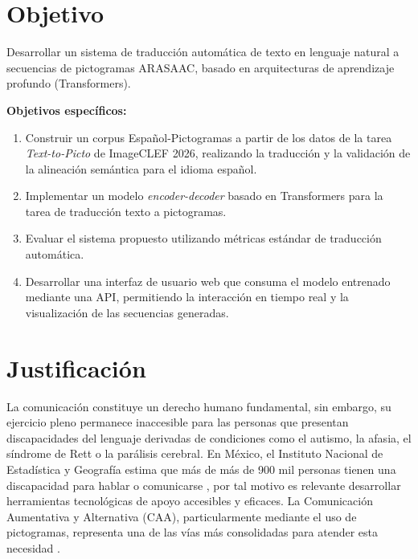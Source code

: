 \documentclass[10pt,letterpaper]{article}
\begin{document}







\section{Objetivo}
Desarrollar un sistema de traducción automática de texto en lenguaje natural a secuencias de pictogramas ARASAAC, basado en arquitecturas de aprendizaje profundo (Transformers).

\textbf{Objetivos específicos:}

\begin{enumerate}
    \item Construir un corpus  Español-Pictogramas a partir de los datos de la tarea \textit{Text-to-Picto} de ImageCLEF 2026, realizando la traducción  y la validación de la alineación semántica para el idioma español.
    \item Implementar un modelo \textit{encoder-decoder} basado en Transformers para la tarea de traducción texto a pictogramas.
    \item Evaluar el sistema propuesto utilizando métricas estándar de traducción automática.
    \item Desarrollar una interfaz de usuario web que consuma el modelo entrenado mediante una API, permitiendo la interacción en tiempo real y la visualización de las secuencias generadas.

\end{enumerate}


\section{Justificación}

La comunicación constituye un derecho humano fundamental, sin embargo, su ejercicio pleno permanece inaccesible para las  personas que presentan discapacidades del lenguaje derivadas de condiciones como el autismo, la afasia, el síndrome de Rett o la parálisis cerebral. En México, el Instituto Nacional de Estadística y Geografía estima que más de más de 900 mil personas tienen una discapacidad para hablar o comunicarse \autocite{inegi2020cpv}, por tal motivo es relevante desarrollar herramientas tecnológicas de apoyo accesibles y eficaces. La Comunicación Aumentativa y Alternativa (CAA), particularmente mediante el uso de pictogramas, representa una de las vías más consolidadas para atender esta necesidad \autocite{beukelman2013}.
\end{document}
